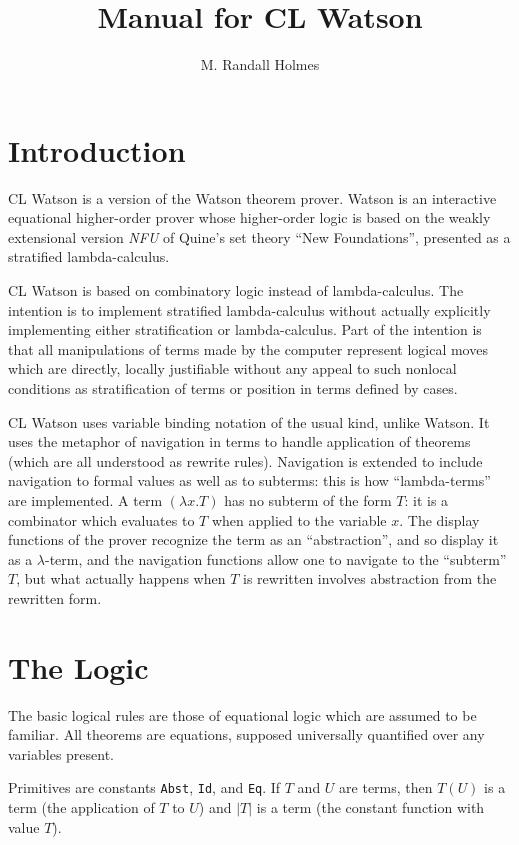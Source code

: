 \documentclass[12pt]{article}
\title{Manual for CL Watson}
\author{M. Randall Holmes}
\begin{document}
\maketitle

\section{Introduction}

CL Watson is a version of the Watson theorem prover.  Watson is an
interactive equational higher-order prover whose higher-order logic is
based on the weakly extensional version {\em NFU\/} of Quine's set
theory ``New Foundations'', presented as a stratified lambda-calculus.

CL Watson is based on combinatory logic instead of lambda-calculus.
The intention is to implement stratified lambda-calculus without
actually explicitly implementing either stratification or
lambda-calculus.  Part of the intention is that all manipulations of
terms made by the computer represent logical moves which are directly,
locally justifiable without any appeal to such nonlocal conditions as
stratification of terms or position in terms defined by cases.

CL Watson uses variable binding notation of the usual kind, unlike
Watson.  It uses the metaphor of navigation in terms to handle
application of theorems (which are all understood as rewrite rules).
Navigation is extended to include navigation to formal values as well
as to subterms: this is how ``lambda-terms'' are implemented.  A term
$(\lambda x.T)$ has no subterm of the form $T$: it is a combinator
which evaluates to $T$ when applied to the variable $x$.  The display
functions of the prover recognize the term as an ``abstraction'', and
so display it as a $\lambda$-term, and the navigation functions allow
one to navigate to the ``subterm'' $T$, but what actually happens when
$T$ is rewritten involves abstraction from the rewritten form.

\section{The Logic}

The basic logical rules are those of equational logic which are
assumed to be familiar.  All theorems are equations, supposed
universally quantified over any variables present.

Primitives are constants {\tt Abst}, {\tt Id}, and {\tt Eq}.  If $T$
and $U$ are terms, then $T(U)$ is a term (the application of $T$ to
$U$) and $|T|$ is a term (the constant function with value $T$).
\end{document}
